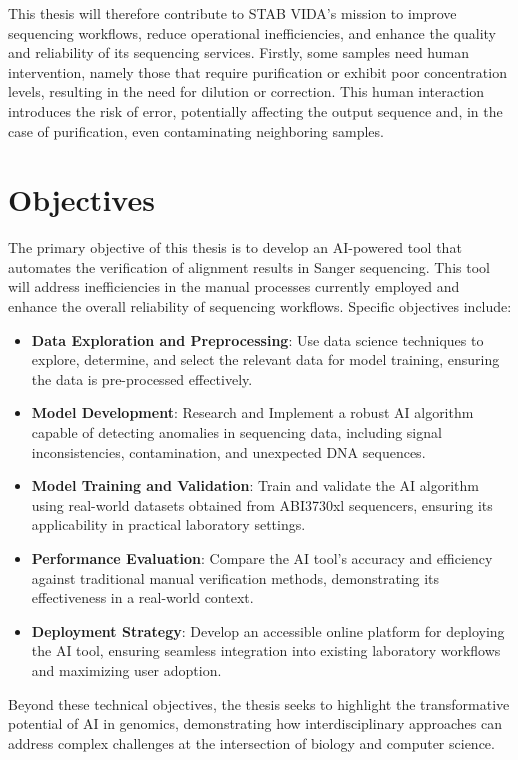 This thesis will therefore contribute to STAB VIDA’s mission to improve sequencing workflows, reduce operational inefficiencies, and enhance the quality and reliability of its sequencing services.
Firstly, some samples need human intervention, namely those that require purification or exhibit poor concentration levels, resulting in the need for dilution or correction. This human interaction introduces the risk of error, potentially affecting the output sequence and, in the case of purification, even contaminating neighboring samples.

\section{Objectives}
\label{sec:Objectives}

The primary objective of this thesis is to develop an AI-powered tool that automates the verification of alignment results in Sanger sequencing. This tool will address inefficiencies in the manual processes currently employed and enhance the overall reliability of sequencing workflows. Specific objectives include:

\begin{itemize}
  \item \textbf{Data Exploration and Preprocessing}: Use data science techniques to explore, determine, and select the relevant data for model training, ensuring the data is pre-processed effectively.
  \item \textbf{Model Development}: Research and Implement a robust AI algorithm capable of detecting anomalies in sequencing data, including signal inconsistencies, contamination, and unexpected DNA sequences.
  \item \textbf{Model Training and Validation}: Train and validate the AI algorithm using real-world datasets obtained from ABI3730xl sequencers, ensuring its applicability in practical laboratory settings.
  \item \textbf{Performance Evaluation}: Compare the AI tool's accuracy and efficiency against traditional manual verification methods, demonstrating its effectiveness in a real-world context.
  \item \textbf{Deployment Strategy}: Develop an accessible online platform for deploying the AI tool, ensuring seamless integration into existing laboratory workflows and maximizing user adoption.
\end{itemize}

Beyond these technical objectives, the thesis seeks to highlight the transformative potential of AI in genomics, demonstrating how interdisciplinary approaches can address complex challenges at the intersection of biology and computer science.

